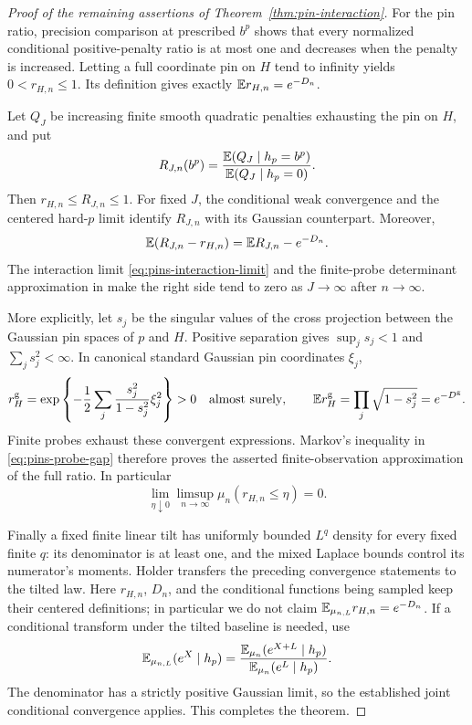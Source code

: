 \begin{proof}[Proof of the remaining assertions of
Theorem~\ref{thm:pin-interaction}]
For the pin ratio, precision comparison at prescribed
\(b^p\) shows that every normalized conditional
positive-penalty ratio is at most one and decreases
when the penalty is increased. Letting a full
coordinate pin on \(H\) tend to infinity yields
\(0<r_{H,n}\le1\). Its definition gives exactly
\(\mathbb E r_{H,n}=e^{-D_n}\).

Let \(Q_J\) be increasing finite smooth quadratic
penalties exhausting the pin on \(H\), and put
\[
 R_{J,n}(b^p)=
 \frac{\mathbb E(Q_J\mid h_p=b^p)}{\mathbb E(Q_J\mid h_p=0)}.
\]
Then \(r_{H,n}\le R_{J,n}\le1\).
For fixed \(J\), the conditional weak convergence
and the centered hard-\(p\) limit identify \(R_{J,n}\)
with its Gaussian counterpart. Moreover,
\begin{equation}
       \mathbb E(R_{J,n}-r_{H,n})=\mathbb E R_{J,n}-e^{-D_n}.
 \label{eq:pins-probe-gap}
\end{equation}
The interaction limit \eqref{eq:pins-interaction-limit}
and the finite-probe determinant approximation in
 make the right side
tend to zero as \(J\to\infty\) after \(n\to\infty\).

More explicitly, let \(s_j\) be the singular values
of the cross projection between the Gaussian pin
spaces of \(p\) and \(H\). Positive separation gives
\(\sup_js_j<1\) and \(\sum_js_j^2<\infty\).
In canonical standard Gaussian pin coordinates
\(\xi_j\),
\[
 r_H^{\mathrm g}
 =\exp\left\{-\frac12\sum_j
           \frac{s_j^2}{1-s_j^2}\xi_j^2\right\}>0
 \quad\hbox{almost surely},\qquad
 \mathbb E r_H^{\mathrm g}=\prod_j\sqrt{1-s_j^2}=e^{-D^{\mathrm g}}.
\]
Finite probes exhaust these convergent expressions.
Markov's inequality in \eqref{eq:pins-probe-gap}
therefore proves the asserted finite-observation
approximation of the full ratio. In particular
\begin{equation}
 \lim_{\eta\downarrow0}\limsup_{n\to\infty}
                  \mu_n(r_{H,n}\le\eta)=0.
 \label{eq:pins-away-zero}
\end{equation}

Finally a fixed finite linear tilt has uniformly
bounded \(L^q\) density for every fixed finite \(q\):
its denominator is at least one, and the mixed
Laplace bounds control its numerator's moments.
Holder transfers the preceding convergence statements
to the tilted law. Here \(r_{H,n}\), \(D_n\), and the
conditional functions being sampled keep their centered
definitions; in particular we do not claim
\(\mathbb E_{\mu_{n,L}}r_{H,n}=e^{-D_n}\).
If a conditional transform under the tilted baseline is
needed, use
\[
 \mathbb E_{\mu_{n,L}}(e^X\mid h_p)
   =\frac{\mathbb E_{\mu_n}(e^{X+L}\mid h_p)}
          {\mathbb E_{\mu_n}(e^L\mid h_p)}.
\]
The denominator has a strictly positive Gaussian limit,
so the established joint conditional convergence applies.
This completes the theorem.
\end{proof}

